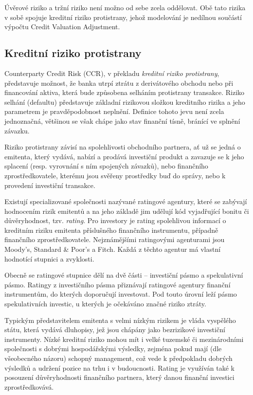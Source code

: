 \documentclass[a4paper,12pt]{report}
\theoremstyle{definition} \newtheorem{definice}[veta]{Definice}
\theoremstyle{remark}
\begin{document}
Úvěrové riziko a tržní riziko není možno od sebe zcela oddělovat.
Obě tato rizika v sobě spojuje kreditní riziko protistrany, jehož modelování je nedílnou součástí výpočtu Credit Valuation Adjustment. 

\subsection{Kreditní riziko protistrany}
Counterparty Credit Risk (CCR), v překladu \textit{kreditní riziko protistrany},  představuje možnost, že banka utrpí ztrátu z derivátového obchodu nebo při financování aktiva, která bude způsobena selháním protistrany transakce. 
Riziko selhání (defaultu) představuje základní rizikovou složkou kreditního rizika a jeho parametrem je pravděpodobnost neplnění. 
Definice tohoto jevu není zcela jednoznačná, většinou se však chápe jako stav finanční tísně, bránící ve splnění závazku.

Riziko protistrany závisí na spolehlivosti obchodního partnera, ať už se jedná o emitenta, který vydává, nabízí a prodává investiční produkt a zavazuje se k jeho splacení (resp. vyrovnání s ním spojených závazků), nebo finančního zprostředkovatele, kterému jsou svěřeny prostředky buď do správy, nebo k provedení investiční transakce.

Existují specializované společnosti nazývané ratingové agentury, které se zabývají hodnocením rizik emitentů %
a na jeho základě jim udělují kód vyjadřující bonitu či důvěryhodnost, tzv. \textit{rating}.
Pro investory je rating spolehlivou informací o kreditním riziku emitenta příslušného finančního instrumentu, případně finančního zprostředkovatele. 
Nejznámějšími ratingovými agenturami jsou Moody's, Standard \& Poor's a Fitch. Každá z těchto agentur má vlastní hodnotící stupnici a zvyklosti.

Obecně se ratingové stupnice dělí na dvě části -- investiční pásmo a spekulativní pásmo.
Ratingy z investičního pásma přiznávají ratingové agentury finanční instrumentům, do kterých doporučují investovat. Pod touto úrovní leží pásmo spekulativních investic, u kterých je očekáváno značné riziko ztráty.

Typickým představitelem emitenta s velmi nízkým rizikem je vláda vyspělého státu, která vydává dluhopisy, jež jsou chápány jako bezrizikové  investiční instrumenty. Nízké kreditní riziko mohou mít i velké tuzemské či mezinárodními společnosti s dobrými hospodářskými výsledky, zejména pokud mají (dle všeobecného názoru) schopný management, což vede k předpokladu dobrých výsledků a udržení pozice na trhu i v budoucnosti.
Rating je využíván také k posouzení  důvěryhodnosti finančního partnera, který danou finanční investici zprostředkovává.
\end{document}
